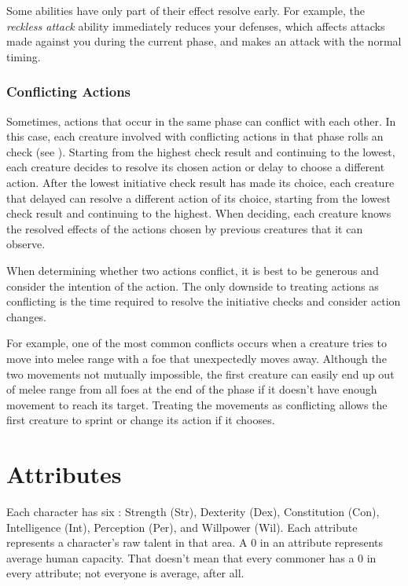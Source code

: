             Some abilities have only part of their effect resolve early.
            For example, the \textit{reckless attack} ability immediately reduces your defenses, which affects attacks made against you during the current phase, and makes an attack with the normal timing.

        \subsubsection{Conflicting Actions}\label{Conflicting Actions}

            Sometimes, actions that occur in the same phase can conflict with each other.
            In this case, each creature involved with conflicting actions in that phase rolls an  check (see ).
            Starting from the highest check result and continuing to the lowest, each creature decides to resolve its chosen action or delay to choose a different action.
            After the lowest initiative check result has made its choice, each creature that delayed can resolve a different action of its choice, starting from the lowest check result and continuing to the highest.
            When deciding, each creature knows the resolved effects of the actions chosen by previous creatures that it can observe.

            When determining whether two actions conflict, it is best to be generous and consider the intention of the action.
            The only downside to treating actions as conflicting is the time required to resolve the initiative checks and consider action changes.

            For example, one of the most common conflicts occurs when a creature tries to move into melee range with a foe that unexpectedly moves away.
            Although the two movements not mutually impossible, the first creature can easily end up out of melee range from all foes at the end of the phase if it doesn't have enough movement to reach its target.
            Treating the movements as conflicting allows the first creature to sprint or change its action if it chooses.

\section{Attributes}\label{Attributes}

    Each character has six : Strength (Str), Dexterity (Dex), Constitution (Con), Intelligence (Int), Perception (Per), and Willpower (Wil).
    Each attribute represents a character's raw talent in that area.
    A 0 in an attribute represents average human capacity.
    That doesn't mean that every commoner has a 0 in every attribute; not everyone is average, after all.

